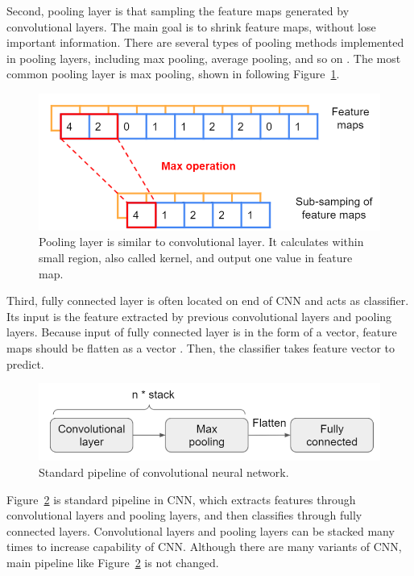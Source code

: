 Second, pooling layer is that sampling the feature maps generated by convolutional layers. The main goal is to shrink feature maps, without lose important information. There are several types of pooling methods implemented in pooling layers, including max pooling, average pooling, and so on \cite{alzubaidi2021review}. The most common pooling layer is max pooling, shown in following Figure~\ref{f5}.

\begin{figure}[H]
    \centering
    \includegraphics[width=0.9\columnwidth]{body/figure/figure5.png}
    \captionsetup{labelfont=bf}
    \renewcommand{\baselinestretch}{1.0}
    \caption[Operation of max pooling]{Pooling layer is similar to convolutional layer. It calculates within small region, also called kernel, and output one value in feature map.}
    \label{f5}
\end{figure}

Third, fully connected layer is often located on end of CNN and acts as classifier. Its input is the feature extracted by previous convolutional layers and pooling layers. Because input of fully connected layer is in the form of a vector, feature maps should be flatten as a vector \cite{alzubaidi2021review}. Then, the classifier takes feature vector to predict.

\begin{figure}[H]
    \centering
    \includegraphics[width=0.9\columnwidth]{body/figure/figure6.png}
    \captionsetup{labelfont=bf}
    \renewcommand{\baselinestretch}{1.0}
    \caption[Standard pipeline of convolutional neural network]{Standard pipeline of convolutional neural network.}
    \label{f6}
\end{figure}

Figure~\ref{f6} is standard pipeline in CNN, which extracts features through convolutional layers and pooling layers, and then classifies through fully connected layers. Convolutional layers and pooling layers can be stacked many times to increase capability of CNN. Although there are many variants of CNN, main pipeline like Figure~\ref{f6} is not changed.

